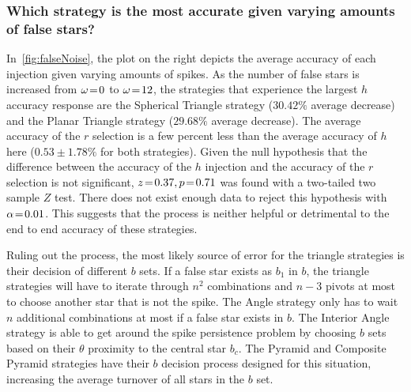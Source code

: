 \subsubsection{Which strategy is the most accurate given varying amounts of false stars?}
%
%
%
%
In~\autoref{fig:falseNoise}, the plot on the right depicts the average accuracy of each injection given varying amounts
of spikes.
As the number of false stars is increased from $\omega \!=\! 0$ to $\omega \!=\! 12$, the strategies that experience
the largest $h$ accuracy response are the Spherical Triangle strategy ($30.42\%$ average decrease) and the Planar
Triangle strategy ($29.68\%$ average decrease).
The average accuracy of the $r$ selection is a few percent less than the average accuracy of $h$ here
($0.53\!\pm\!1.78\%$ for both strategies).
Given the null hypothesis that the difference between the accuracy of the $h$ injection and the accuracy of the $r$
selection is not significant, $z \!=\! 0.37, p \!=\! 0.71$ was found with a two-tailed two sample $Z$ test.
There does not exist enough data to reject this hypothesis with $\alpha \!=\! 0.01$.
This suggests that the  process is neither helpful or detrimental to the end to end accuracy of these
strategies.

Ruling out the  process, the most likely source of error for the triangle strategies is their decision of
different $b$ sets.
If a false star exists as $b_1$ in $b$, the triangle strategies will have to iterate through $n^2$ combinations and
$n - 3$ pivots at most to choose another star that is not the spike.
The Angle strategy only has to wait $n$ additional combinations at most if a false star exists in $b$.
The Interior Angle strategy is able to get around the spike persistence problem by choosing $b$ sets based on their
$\theta$ proximity to the central star $b_c$.
The Pyramid and Composite Pyramid strategies have their $b$ decision process designed for this situation, increasing the
average turnover of all stars in the $b$ set.

